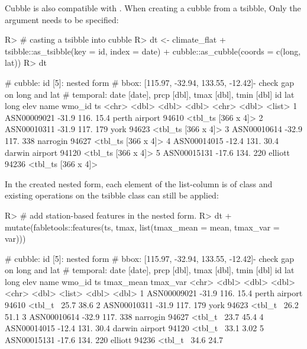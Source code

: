 \documentclass[
]{jss}
\begin{document}
Cubble is also compatible with . When creating a cubble
from a tsibble, Only the  argument needs to be specified:

\begin{CodeChunk}
\begin{CodeInput}
R> # casting a tsibble into cubble
R> dt <- climate_flat %
+   tsibble::as_tsibble(key = id, index = date) %
+   cubble::as_cubble(coords = c(long, lat))
R> dt
\end{CodeInput}
\begin{CodeOutput}
# cubble:   id [5]: nested form
# bbox:     [115.97, -32.94, 133.55, -12.42]- check gap on long and lat
# temporal: date [date], prcp [dbl], tmax [dbl], tmin [dbl]
  id            lat  long  elev name           wmo_id ts                
  <chr>       <dbl> <dbl> <dbl> <chr>           <dbl> <list>            
1 ASN00009021 -31.9  116.  15.4 perth airport   94610 <tbl_ts [366 x 4]>
2 ASN00010311 -31.9  117. 179   york            94623 <tbl_ts [366 x 4]>
3 ASN00010614 -32.9  117. 338   narrogin        94627 <tbl_ts [366 x 4]>
4 ASN00014015 -12.4  131.  30.4 darwin airport  94120 <tbl_ts [366 x 4]>
5 ASN00015131 -17.6  134. 220   elliott         94236 <tbl_ts [366 x 4]>
\end{CodeOutput}
\end{CodeChunk}

In the created nested form, each element of the list-column  is
of  class and existing operations on the tsibble class can
still be applied:

\begin{CodeChunk}
\begin{CodeInput}
R> # add station-based features in the nested form.
R> dt %
+   mutate(fabletools::features(ts, tmax, list(tmax_mean = mean, tmax_var = var)))
\end{CodeInput}
\begin{CodeOutput}
# cubble:   id [5]: nested form
# bbox:     [115.97, -32.94, 133.55, -12.42]- check gap on long and lat
# temporal: date [date], prcp [dbl], tmax [dbl], tmin [dbl]
  id            lat  long  elev name           wmo_id ts      tmax_mean tmax_var
  <chr>       <dbl> <dbl> <dbl> <chr>           <dbl> <list>      <dbl>    <dbl>
1 ASN00009021 -31.9  116.  15.4 perth airport   94610 <tbl_t~      25.7    38.6 
2 ASN00010311 -31.9  117. 179   york            94623 <tbl_t~      26.2    51.1 
3 ASN00010614 -32.9  117. 338   narrogin        94627 <tbl_t~      23.7    45.4 
4 ASN00014015 -12.4  131.  30.4 darwin airport  94120 <tbl_t~      33.1     3.02
5 ASN00015131 -17.6  134. 220   elliott         94236 <tbl_t~      34.6    24.7 
\end{CodeOutput}
\end{CodeChunk}
\end{document}

